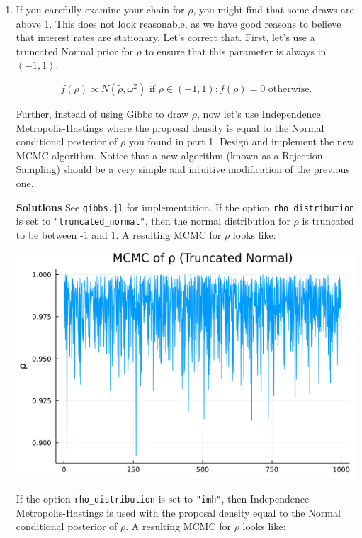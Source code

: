 \documentclass{article}
\begin{document}
\begin{enumerate}
\pagebreak

\item  If you carefully examine your chain for $\rho$, you might find that some draws are above 1. This
does not look reasonable, as we have good reasons to believe that interest rates are stationary.
Let's correct that. First, let's use a truncated Normal prior for $\rho$ to ensure that this parameter
is always in $(-1, 1)$:

$$
f(\rho) \propto N (\tilde\rho, \omega^2) \text{ if } \rho \in (-1, 1); f(\rho) = 0 \text{ otherwise}.
$$

Further, instead of using Gibbs to draw $\rho$, now let's use Independence Metropolis-Hastings
where the proposal density is equal to the Normal conditional posterior of $\rho$ you found in part 1. Design and implement the new MCMC algorithm. Notice that a new algorithm (known
as a Rejection Sampling) should be a very simple and intuitive modification of the previous
one.

\textbf{Solutions}  See \texttt{gibbs.jl} for implementation.  If the option \texttt{rho\_distribution} is set to \texttt{"truncated\_normal"}, then the normal distribution for $\rho$ is truncated to be between -1 and 1.  A resulting MCMC for $\rho$ looks like:

\begin{center}
\includegraphics[scale =0.5]{p2_q5_rho_truncated_normal}
\end{center}

If the option \texttt{rho\_distribution} is set to \texttt{"imh"}, then Independence Metropolis-Hastings is used with the proposal density equal to the Normal conditional posterior of $\rho$. A resulting MCMC for $\rho$ looks like:


\end{enumerate}
\end{document}
